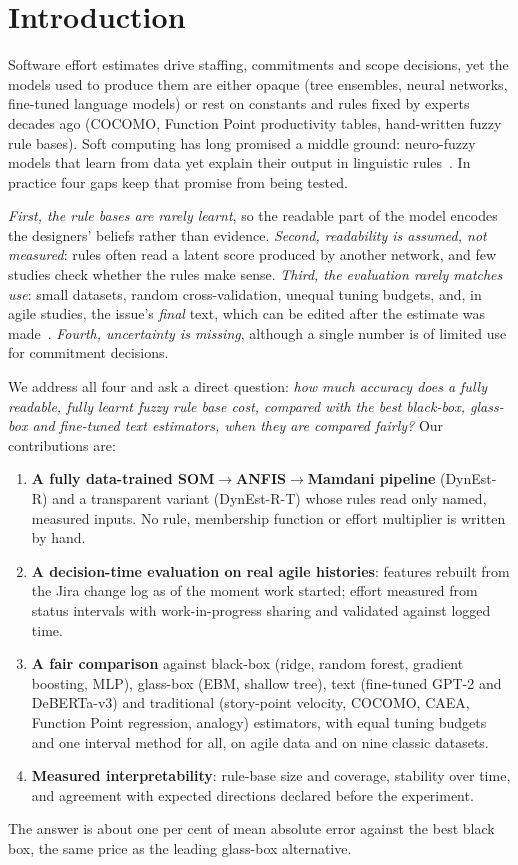 \documentclass[preprint,12pt,authoryear]{elsarticle}
\newcommand{\dynest}{DynEst-R\xspace}
\begin{document}
\section{Introduction}
\label{sec:intro}

Software effort estimates drive staffing, commitments and scope decisions, yet the models used to produce them are
either opaque (tree ensembles, neural networks, fine-tuned language models) or rest on constants and rules fixed by
experts decades ago (COCOMO, Function Point productivity tables, hand-written fuzzy rule bases).  Soft computing has
long promised a middle ground: neuro-fuzzy models that learn from data yet explain their output in linguistic
rules~\citep{huang2007neurofuzzy}.  In practice four gaps keep that promise from being tested.

\emph{First, the rule bases are rarely learnt}, so the readable part of the model encodes the designers' beliefs
rather than evidence.  \emph{Second, readability is assumed, not measured}: rules often read a latent score
produced by another network, and few studies check whether the rules make sense.  \emph{Third, the evaluation rarely
matches use}: small datasets, random cross-validation, unequal tuning budgets, and, in agile studies, the issue's
\emph{final} text, which can be edited after the estimate was made~\citep{tawosi2023deepse}.  \emph{Fourth,
uncertainty is missing}, although a single number is of limited use for commitment decisions.

We address all four and ask a direct question: \emph{how much accuracy does a fully readable, fully learnt fuzzy
rule base cost, compared with the best black-box, glass-box and fine-tuned text estimators, when they are compared
fairly?}  Our contributions are:
\begin{enumerate}
  \item \textbf{A fully data-trained SOM$\rightarrow$ANFIS$\rightarrow$Mamdani pipeline} (\dynest) and a transparent
  variant (\dynest-T) whose rules read only named, measured inputs.  No rule, membership function or effort
  multiplier is written by hand.
  \item \textbf{A decision-time evaluation on real agile histories}: features rebuilt from the Jira change log as of
  the moment work started; effort measured from status intervals with work-in-progress sharing and validated against
  logged time.
  \item \textbf{A fair comparison} against black-box (ridge, random forest, gradient boosting, MLP), glass-box (EBM,
  shallow tree), text (fine-tuned GPT-2 and DeBERTa-v3) and traditional (story-point velocity, COCOMO, CAEA,
  Function Point regression, analogy) estimators, with equal tuning budgets and one interval
  method for all, on agile data and on nine classic datasets.
  \item \textbf{Measured interpretability}: rule-base size and coverage, stability over time, and agreement with
  expected directions declared before the experiment.
\end{enumerate}
The answer is about one per cent of mean absolute error against the best black box, the same price as the leading
glass-box alternative.
\end{document}
